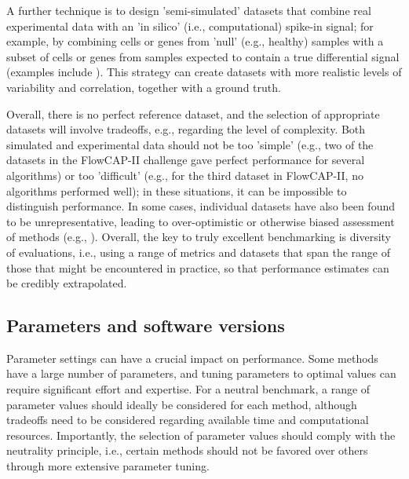 A further technique is to design 'semi-simulated' datasets that combine real experimental data with an 'in silico' (i.e., computational) spike-in signal; for example, by combining cells or genes from 'null' (e.g., healthy) samples with a subset of cells or genes from samples expected to contain a true differential signal (examples include \cite{weber_diffcytdifferentialdiscovery_2019,arvaniti_sensitivedetectionrare_2017,rigaill_syntheticdatasets_2018}). This strategy can create datasets with more realistic levels of variability and correlation, together with a ground truth.

Overall, there is no perfect reference dataset, and the selection of appropriate datasets will involve tradeoffs, e.g., regarding the level of complexity. Both simulated and experimental data should not be too 'simple' (e.g., two of the datasets in the FlowCAP-II challenge \cite{aghaeepour_criticalassessmentautomated_2013} gave perfect performance for several algorithms) or too 'difficult' (e.g., for the third dataset in FlowCAP-II, no algorithms performed well); in these situations, it can be impossible to distinguish performance. In some cases, individual datasets have also been found to be unrepresentative, leading to over-optimistic or otherwise biased assessment of methods (e.g., \cite{lowes_bralibasedentatale_2017}). Overall, the key to truly excellent benchmarking is diversity of evaluations, i.e., using a range of metrics and datasets that span the range of those that might be encountered in practice, so that performance estimates can be credibly extrapolated.

\subsection{Parameters and software versions}

Parameter settings can have a crucial impact on performance. Some methods have a large number of parameters, and tuning parameters to optimal values can require significant effort and expertise. For a neutral benchmark, a range of parameter values should ideally be considered for each method, although tradeoffs need to be considered regarding available time and computational resources. Importantly, the selection of parameter values should comply with the neutrality principle, i.e., certain methods should not be favored over others through more extensive parameter tuning.

